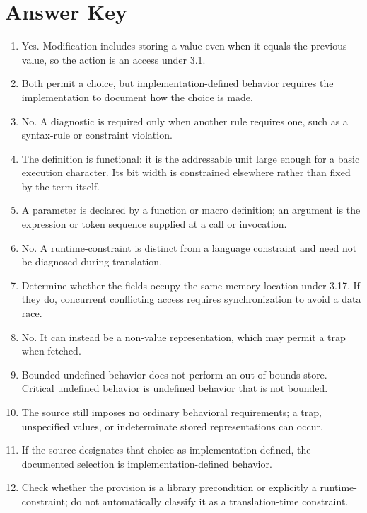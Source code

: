 \documentclass[10pt,letterpaper]{article}
\begin{document}
\section{Answer Key}
\begin{enumerate}
  \item Yes. Modification includes storing a value even when it equals the previous value, so the action is an access under 3.1.

  \item Both permit a choice, but implementation-defined behavior requires the implementation to document how the choice is made.

  \item No. A diagnostic is required only when another rule requires one, such as a syntax-rule or constraint violation.

  \item The definition is functional: it is the addressable unit large enough for a basic execution character. Its bit width is constrained elsewhere rather than fixed by the term itself.

  \item A parameter is declared by a function or macro definition; an argument is the expression or token sequence supplied at a call or invocation.

  \item No. A runtime-constraint is distinct from a language constraint and need not be diagnosed during translation.

  \item Determine whether the fields occupy the same memory location under 3.17. If they do, concurrent conflicting access requires synchronization to avoid a data race.

  \item No. It can instead be a non-value representation, which may permit a trap when fetched.

  \item Bounded undefined behavior does not perform an out-of-bounds store. Critical undefined behavior is undefined behavior that is not bounded.

  \item The source still imposes no ordinary behavioral requirements; a trap, unspecified values, or indeterminate stored representations can occur.

  \item If the source designates that choice as implementation-defined, the documented selection is implementation-defined behavior.

  \item Check whether the provision is a library precondition or explicitly a runtime-constraint; do not automatically classify it as a translation-time constraint.
\end{enumerate}
\end{document}
